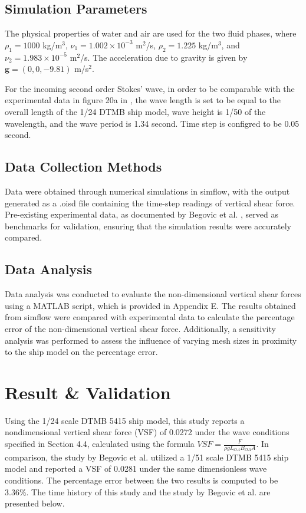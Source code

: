 \documentclass[12pt]{article} %
\begin{document}
\subsection{Simulation Parameters}
The physical properties of water and air are used for the two fluid phases, where \(\rho_1 = 1000\) kg/m\(^3\), \(\nu_1 = 1.002 \times 10^{-3}\) m\(^2\)/s, \(\rho_2 = 1.225\) kg/m\(^3\), and \(\nu_2 = 1.983 \times 10^{-5}\) m\(^2\)/s. The acceleration due to gravity is given by \(\mathbf{g} = (0, 0, -9.81)\) m/s\(^2\).

For the incoming second order Stokes' wave, in order to be comparable with the experimental data in figure 20a in \cite{Begovic2017}, the wave length is set to be equal to the 
overall length of the 1/24 DTMB ship model, wave height is 1/50 of the wavelength, and the wave period is 1.34 second. Time step is configred to be 0.05 second.

\subsection{Data Collection Methods}
Data were obtained through numerical simulations in simflow, with the output generated as a .oisd file 
containing the time-step readings of vertical shear force. Pre-existing experimental data, as documented 
by Begovic et al. \cite{Begovic2017}, served as benchmarks for validation, ensuring that the simulation 
results were accurately compared.

\subsection{Data Analysis}
Data analysis was conducted to evaluate the non-dimensional vertical shear forces using a MATLAB script, which is provided 
in Appendix E. The results obtained from simflow were compared with experimental data to calculate the 
percentage error of the non-dimensional vertical shear force. Additionally, a sensitivity analysis was 
performed to assess the influence of varying mesh sizes in proximity to the ship model on the percentage error.

\clearpage
\section{Result \& Validation}
Using the 1/24 scale DTMB 5415 ship model, this study reports a nondimensional vertical shear force 
(VSF) of 0.0272 under the wave conditions specified in Section 4.4, calculated using the formula 
\( VSF = \frac{F}{\rho g L_{OA} B_{OA} A} \). In comparison, the study by Begovic et al. \cite{Begovic2017} 
utilized a 1/51 scale DTMB 5415 ship model and reported a VSF of 0.0281 under the same dimensionless wave 
conditions. The percentage error between the two results is computed to be 3.36\%. The time history of this study and 
the study by Begovic et al. \cite{Begovic2017} are presented below.
\end{document}

